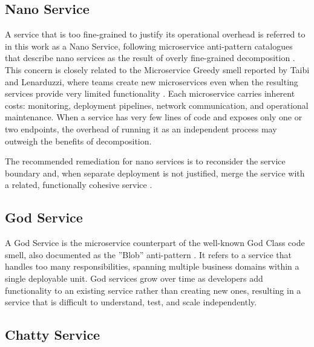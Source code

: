 \subsection{Nano Service}
\label{subsec:nano-service}

\par A service that is too fine-grained to justify its operational overhead is referred to in this work as a Nano Service, following microservice anti-pattern catalogues that describe nano services as the result of overly fine-grained decomposition \cite{Tighilt2023}. This concern is closely related to the Microservice Greedy smell reported by Taibi and Lenarduzzi, where teams create new microservices even when the resulting services provide very limited functionality \cite{Taibi2018}. Each microservice carries inherent costs: monitoring, deployment pipelines, network communication, and operational maintenance. When a service has very few lines of code and exposes only one or two endpoints, the overhead of running it as an independent process may outweigh the benefits of decomposition.


The recommended remediation for nano services is to reconsider the service boundary and, when separate deployment is not justified, merge the service with a related, functionally cohesive service \cite{Tighilt2023}.

\subsection{God Service}
\label{subsec:god-service}

\par A God Service is the microservice counterpart of the well-known God Class code smell, also documented as the ''Blob'' anti-pattern \cite{Brown1998}. It refers to a service that handles too many responsibilities, spanning multiple business domains within a single deployable unit. God services grow over time as developers add functionality to an existing service rather than creating new ones, resulting in a service that is difficult to understand, test, and scale independently.


\subsection{Chatty Service}
\label{subsec:chatty-service}

